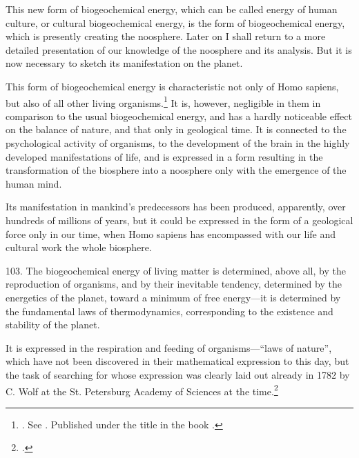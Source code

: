 This new form of biogeochemical energy, which can be called energy of human
culture, or cultural biogeochemical energy, is the form of biogeochemical
energy, which is presently creating the noosphere.  Later on I shall return to
a more detailed presentation of our knowledge of the noosphere and its
analysis.  But it is now necessary to sketch its manifestation on the planet.

This form of biogeochemical energy is characteristic not only of Homo sapiens,
but also of all other living
organisms.\footnote{
	\foreignlanguage{russian}{\cite[30--48]{vernadsky1926biosfera}}.  See
	\foreignlanguage{russian}{\cites[330--341]{vernadsky1994zhivoe}{vernadsky1926razmnozhenii1}{vernadsky1926razmnozhenii2}}.
	Published under the title \foreignlanguage{russian}{} in the book
	\foreignlanguage{russian}{\cite[75--101]{vernadsky1992trudy}}.
}  It is, however, negligible in them in comparison to the usual biogeochemical
energy, and has a hardly noticeable effect on the balance of nature, and that
only in geological time.  It is connected to the psychological activity of
organisms, to the development of the brain in the highly developed
manifestations of life, and is expressed in a form resulting in the
transformation of the biosphere into a noosphere only with the emergence of the
human mind.

Its manifestation in mankind's predecessors has been produced, apparently,
over hundreds of millions of years, but it could be expressed in the form of a
geological force only in our time, when Homo sapiens has encompassed with our
life and cultural work the whole biosphere.


103. The biogeochemical energy of living matter is determined, above all, by
the reproduction of organisms, and by their inevitable tendency, determined by
the energetics of the planet, toward a minimum of free energy---it is
determined by the fundamental laws of thermodynamics, corresponding to the
existence and stability of the planet.

It is expressed in the respiration and feeding of organisms---``laws of
nature'', which have not been discovered in their mathematical expression to
this day, but the task of searching for whose expression was clearly laid out
already in 1782 by C. Wolf at the St. Petersburg Academy of
Sciences at the
time.\foreignlanguage{russian}{\footcite{vernadsky1954sochineniya-himicheskie}}

